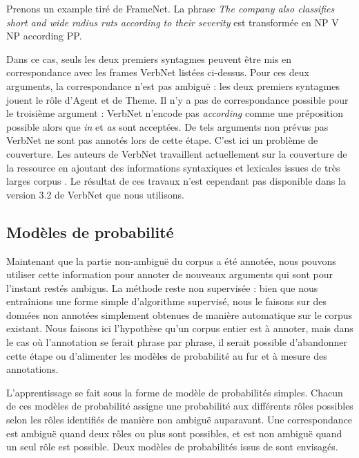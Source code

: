 Prenons un example tiré de FrameNet. La phrase \emph{The company also
classifies short and wide radius ruts according to their severity} est
transformée en NP V NP according PP.

Dans ce cas, seuls les deux premiers syntagmes peuvent être mis en
correspondance avec les frames VerbNet listées ci-dessus. Pour ces deux
arguments, la correspondance n'est pas ambiguë : les deux premiers syntagmes
jouent le rôle d'Agent et de Theme. Il n'y a pas de correspondance possible
pour le troisième argument : VerbNet n'encode pas \emph{according} comme une
préposition possible alors que \emph{in} et \emph{as} sont acceptées. De tels
arguments non prévus pas VerbNet ne sont pas annotés lors de cette étape. C'est
ici un problème de couverture. Les auteurs de VerbNet travaillent actuellement
sur la couverture de la ressource en ajoutant des informations syntaxiques et
lexicales issues de très larges corpus \citep{bonial2013expanding}. Le résultat
de ces travaux n'est cependant pas disponible dans la version 3.2 de VerbNet
que nous utilisons.


\subsection{Modèles de probabilité}
\label{subsec:probability}

Maintenant que la partie non-ambiguë du corpus a été annotée, nous pouvons
utiliser cette information pour annoter de nouveaux arguments qui sont pour
l'instant restés ambigus. La méthode reste non supervisée : bien que nous
entraînions une forme simple d'algorithme supervisé, nous le faisons sur des
données non annotées simplement obtenues de manière automatique sur le corpus
existant. Nous faisons ici l'hypothèse qu'un corpus entier est à annoter, mais
dans le cas où l'annotation se ferait phrase par phrase, il serait possible
d'abandonner cette étape ou d'alimenter les modèles de probabilité au fur et à
mesure des annotations.

L'apprentissage se fait sous la forme de modèle de probabilités simples.
Chacun de ces modèles de probabilité assigne une probabilité aux différents
rôles possibles selon les rôles identifiés de manière non ambiguë auparavant.
Une correspondance est ambiguë quand deux rôles ou plus sont possibles, et est
non ambiguë quand un seul rôle est possible. Deux modèles de probabilités issus
de \citep{swier2005exploiting} sont envisagés.

